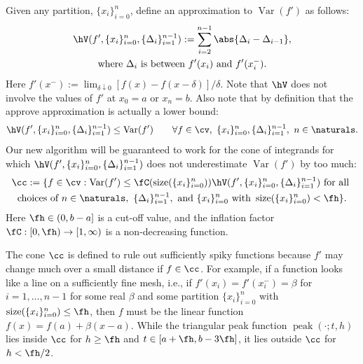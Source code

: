 \documentclass[]{article}
\DeclareMathOperator{\Var}{Var}
\DeclareMathOperator{\size}{size}
\theoremstyle{definition}
\theoremstyle{remark}
\DeclareMathOperator{\tri}{peak}
\newcommand{\datasites}{\{x_i\}_{i=0}^n}
\newcommand{\hcut}{\fh}
\begin{document}
Given any partition, $\datasites$, define an approximation to $\Var(f')$ as follows:
\begin{multline} \label{tVdef}
\hV(f',\datasites,\{\Delta_{i}\}_{i=1}^{n-1}) : = \sum_{i=2}^{n-1} \abs{\Delta_{i} - \Delta_{i-1}}, \\
\text{where } \Delta_{i} \text{ is between } f'(x_i) \text{ and } f'(x_i^-).
\end{multline}
Here $f'(x^-):= \lim_{\delta \downarrow 0} [f(x) - f(x-\delta)]/\delta$.  Note that $\hV$ does not involve the values of $f'$ at $x_0=a$ or $x_n=b$.  Also note that by definition that the approve approximation is actually a lower bound:
\begin{equation} \label{hVlowerbd}
\hV(f',\datasites,\{\Delta_{i}\}_{i=1}^{n-1}) \le \Var(f') \qquad \forall f \in \cv, \ \datasites, \{\Delta_{i}\}_{i=1}^{n-1}, \ n \in \naturals.
\end{equation}
Our new algorithm will be guaranteed to work for the cone of integrands for which $\hV(f',\datasites,\{\Delta_{i}\}_{i=1}^{n-1})$ does not underestimate $\Var(f')$ by too much:
\begin{multline} \label{conedef}
\cc := \{ f \in \cv : \Var(f') \le \fC(\size(\datasites)) \hV(f',\datasites,\{\Delta_{i}\}_{i=1}^{n-1}) \text{ for all } \\
\text{choices of }  n \in \naturals, \ \{\Delta_{i}\}_{i=1}^{n-1}, \text{ and }\datasites \text{ with } \size(\datasites) < \hcut \}.
\end{multline}
Here $\hcut \in (0, b-a]$ is a cut-off value, and the inflation factor $\fC:[0,\hcut) \to [1,\infty)$ is a non-decreasing function.

The cone $\cc$ is defined to rule out sufficiently spiky functions because $f'$ may change much over a small distance if $f \in \cc$.  For example, if a function looks like a line on a sufficiently fine mesh, i.e., if $f'(x_i)=f'(x_i^-)=\beta$ for $i=1, \ldots, n-1$ for some real $\beta$ and some partition $\datasites$ with $\size(\datasites) \le \hcut$, then $f$ must be the linear function $f(x)= f(a) + \beta(x-a)$.  While the triangular peak function $\tri(\cdot;t,h)$ lies inside $\cc$ for $h \ge \hcut$ and $t \in [a+\hcut,b-3\hcut]$, it lies outside $\cc$ for $h < \hcut/2$.
\end{document}
